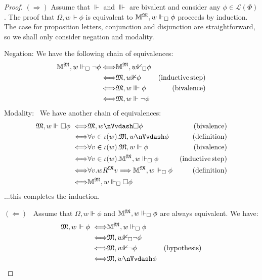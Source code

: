 \begin{proof}
  $(\Longrightarrow)$  Assume that $\Vdash$ and $\Vvdash$ are bivalent and
  consider any $\phi \in \mathcal{L} (\Phi)$.   The proof that $\Omega, w
  \Vdash \phi$ is equivalent to $\mathbbm{M}^{\Omega}, w \Vdash_{\Box} \phi$
  proceeds by induction.   The case for proposition letters, conjunction and
  disjunction are straightforward, so we shall only consider negation and
  modality.
  
  Negation:  We have the following chain of equivalences:
  \begin{eqnarray*}
    \mathbbm{M}^{\Omega}, w \Vdash_{\Box} \neg \phi  
    \Longleftrightarrow & \mathbbm{M}^{\Omega}, w {\nVdash}_{\Box} \phi &
    \\
    \Longleftrightarrow & \Omega, w {\nVdash} \phi & (\tmop{inductive}
    \tmop{step})\\
    \Longleftrightarrow & \Omega, w \Vvdash \phi & (\tmop{bivalence})\\
    \Longleftrightarrow & \Omega, w \Vdash \neg \phi & 
  \end{eqnarray*}
  Modality: \ We have another chain of equivalences:
  \begin{eqnarray*}
    \Omega, w \Vdash \Box \phi \  \Longleftrightarrow & \Omega, w
    {\nVvdash} \Box \phi & (\tmop{bivalence})\\
    \Longleftrightarrow & \forall v \in \iota (w) .  \Omega, w {\nVvdash}
    \phi & (\tmop{definition})\\
    \Longleftrightarrow & \forall v \in \iota (w) .  \Omega, w \Vdash \phi &
    (\tmop{bivalence})\\
    \Longleftrightarrow & \forall v \in \iota (w) .\mathbbm{M}^{\Omega}, w
    \Vdash_{\Box} \phi & (\tmop{inductive} \tmop{step})\\
    \Longleftrightarrow & \forall v.w R^{\Omega} v \Longrightarrow
    \mathbbm{M}^{\Omega}, w \Vdash_{\Box} \phi & (\tmop{definition})\\
    \Longleftrightarrow & \mathbbm{M}^{\Omega}, w \Vdash_{\Box} \Box \phi & 
  \end{eqnarray*}
  $\ldots$this completes the induction.
  
  $(\Longleftarrow)$ \ Assume that $\Omega, w \Vdash \phi$ and
  $\mathbbm{M}^{\Omega}, w \Vdash_{\Box} \phi$ are always equivalent.   We
  have:
  \begin{eqnarray*}
    \Omega, w \Vdash \phi \  \Longleftrightarrow &
    \mathbbm{M}^{\Omega}, w \Vdash_{\Box} \phi & \\
    \Longleftrightarrow & \Omega, w {\nVdash}_{\Box} \neg \phi & \\
    \Longleftrightarrow & \Omega, w {\nVdash} \neg \phi &
    (\tmop{hypothesis})\\
    \Longleftrightarrow & \Omega, w {\nVvdash} \phi & 
  \end{eqnarray*}
\end{proof}

